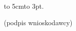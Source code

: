 \begin{itemize}
			
		\end{itemize}

\vfill\noindent\hspace{.75\textwidth}\begin{minipage}{15em}
\begin{center}
	\hbox to 5cm{\leaders\hbox to 3pt{\hss . \hss}\hfil}

	(podpis wnioskodawcy)
\end{center}
\end{minipage}